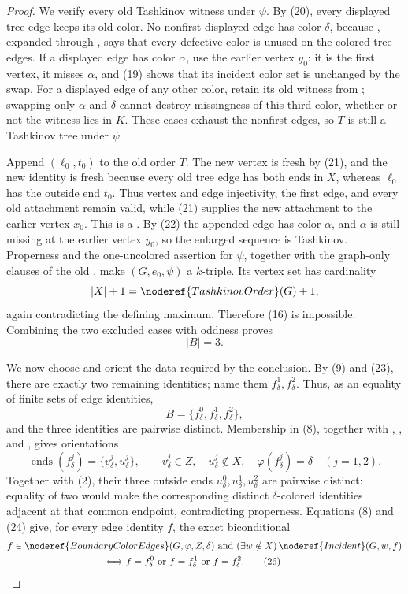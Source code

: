 \begin{proof}
We verify every old Tashkinov witness under $\psi$.  By (20), every
displayed tree edge keeps its old color.  No nonfirst displayed edge has
color $\delta$, because
, expanded through
, says that every defective color is unused on
the colored tree edges.  If a displayed edge has color $\alpha$, use the
earlier vertex $y_0$: it is the first vertex, it misses $\alpha$, and
(19) shows that its incident color set is unchanged by the swap.  For a
displayed edge of any other color, retain its old witness from
; swapping only $\alpha$ and $\delta$ cannot
destroy missingness of this third color, whether or not the witness lies
in $K$.  These cases exhaust the nonfirst edges, so $T$ is still a
Tashkinov tree under $\psi$.

Append $(\ell_0,t_0)$ to the old order $T$.  The new vertex is fresh by
(21), and the new identity is fresh because every old tree edge has both
ends in $X$, whereas $\ell_0$ has the outside end $t_0$.  Thus vertex
and edge injectivity, the first edge, and every old attachment remain
valid, while (21) supplies the new attachment to the earlier vertex
$x_0$.  This is a .  By (22) the appended edge has
color $\alpha$, and $\alpha$ is still missing at the earlier vertex
$y_0$, so the enlarged sequence is Tashkinov.  Properness and the
one-uncolored assertion for $\psi$, together with the graph-only clauses
of the old , make $(G,e_0,\psi)$ a $k$-triple.  Its
vertex set has cardinality
\[
 |X|+1=\noderef{TashkinovOrder}(G)+1,
\]
again contradicting the defining maximum.  Therefore (16) is impossible.
Combining the two excluded cases with oddness proves
\[
 |B|=3.                                                       \tag{23}
\]

We now choose and orient the data required by the conclusion.  By (9)
and (23), there are exactly two remaining identities; name them
$f^1_\delta,f^2_\delta$.  Thus, as an equality of finite sets of edge
identities,
\[
 B=\{f^0_\delta,f^1_\delta,f^2_\delta\},                     \tag{24}
\]
and the three identities are pairwise distinct.  Membership in (8),
together with , , and
, gives orientations
\[
 \operatorname{ends}(f^j_\delta)=\{v^j_\delta,u^j_\delta\},
 \qquad v^j_\delta\in Z,\quad u^j_\delta\notin X,\quad
 \varphi(f^j_\delta)=\delta\quad(j=1,2).                    \tag{25}
\]
Together with (2), their three outside ends
$u^0_\delta,u^1_\delta,u^2_\delta$ are pairwise distinct: equality of
two would make the corresponding distinct $\delta$-colored identities
adjacent at that common endpoint, contradicting properness.  Equations
(8) and (24) give, for every edge identity $f$, the exact biconditional
\[
 \begin{split}
 &f\in\noderef{BoundaryColorEdges}(G,\varphi,Z,\delta)
   \text{ and }(\exists w\notin X)\,
       \noderef{Incident}(G,w,f)\\
 &\hspace{35mm}\Longleftrightarrow
 f=f^0_\delta\ \text{or}\ f=f^1_\delta\ \text{or}\
 f=f^2_\delta.                                               \tag{26}
 \end{split}
\]


\end{proof}
